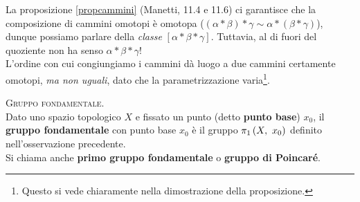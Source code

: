 \begin{attention}
	La proposizione \ref{propcammini} (Manetti, 11.4 e 11.6) ci garantisce che la composizione di cammini omotopi è omotopa ($\left(\alpha\ast\beta\right)\ast \gamma \sim \alpha\ast\left(\beta\ast\gamma\right)$), dunque possiamo parlare della \textit{classe} $\left[\alpha\ast\beta\ast\gamma\right]$. Tuttavia, al di fuori del quoziente non ha senso $\alpha\ast\beta\ast\gamma$!\\
	L'ordine con cui congiungiamo i cammini dà luogo a due cammini certamente omotopi, \textit{ma non uguali}, dato che la parametrizzazione varia\footnote{Questo si vede chiaramente nella dimostrazione della proposizione.}.
\end{attention}
\begin{define}\textsc{Gruppo fondamentale.}\\
	Dato uno spazio topologico $X$ e fissato un punto (detto \textbf{punto base}) $x_0$, il \textbf{gruppo fondamentale} con punto base $x_0$ è il gruppo $\gruf{X}{x_0}$ definito nell'osservazione precedente.\\
	Si chiama anche \textbf{primo gruppo fondamentale} o \textbf{gruppo di Poincaré}.
\end{define}
